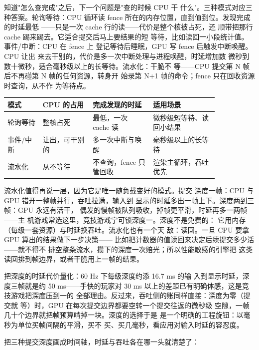 知道"怎么查完成"之后，下一个问题是"查的时候 CPU 干
什么"。三种模式对应三种答案。轮询等待：CPU 循环读
fence 所在的内存位置，直到值到位。发现完成的时延最低
——只是一次 cache 行的读——代价是整个核被占死，还
顺带把那行 cache 踢来踢去。它适合提交后马上要结果的短
等待，比如读回一小段统计值。事件/中断：CPU 在 fence 上
登记等待后睡眠，GPU 写 fence 后触发中断唤醒。CPU 让出
来去干别的，代价是多一次中断处理与进程唤醒，时延增加数
微秒到数十微秒，适合毫秒级以上的长等待。流水化：干脆不
等——CPU 提交第 N 帧后不再碰第 N 帧的任何资源，转身开
始录第 N+1 帧的命令；fence 只在回收资源时查询，从不作
为等待点。

\begin{longtable}{L{0.14\linewidth}L{0.2\linewidth}L{0.24\linewidth}L{0.26\linewidth}}
\toprule
模式 & CPU 的占用 & 完成发现的时延 & 适用场景 \\
\midrule
轮询等待 & 整核占死 & 最低，一次 cache 读 & 微秒级短等待、读回小结果 \\
事件/中断 & 让出，可干别的 & 多一次中断与唤醒 & 毫秒级以上的长等待 \\
流水化 & 从不等待 & 不查询，fence 只管回收 & 渲染主循环，吞吐优先 \\
\bottomrule
\end{longtable}

流水化值得再说一层，因为它是唯一随负载变好的模式。提交
深度一帧：CPU 与 GPU 错开一整帧并行，吞吐拉满，输入到
显示的时延多出一帧上下。深度两到三帧：GPU 永远有活干，
偶发的慢帧被队列吸收，掉帧更平滑，时延再多一两帧——主
机游戏常选这里，竞技游戏宁可锁深度一。深度不是免费的：
它用内存（每级一套资源）与时延换吞吐。流水化也有一个天
敌：读回。一旦 CPU 要拿 GPU 算出的结果做下一步决策——
比如把计数器的值读回来决定后续提交多少活——就不得不
排空整条流水，攒下的深度一次赔光；所以性能敏感的引擎把
这类读回排到帧边界，或者干脆用上一帧的结果。

把深度的时延代价量化：60 Hz 下每级深度约添 16.7 ms 的输
入到显示时延，深度三帧就是约 50 ms——手快的玩家对 30
ms 以上的差距已有明确体感，这是竞技游戏把深度压到一的
全部理由。反过来，吞吐侧的账同样直接：深度为零（提交就
等）时，GPU 在每次提交边界都要空转一个提交往返的微秒级
空隙，一帧几十个边界就把帧预算啃掉一块。深度的选择于是
是一个明确的工程旋钮：以毫秒为单位买帧间隔的平滑，买不
买、买几毫秒，看应用对输入时延的容忍度。

把三种提交深度画成时间轴，时延与吞吐各在哪一头就清楚了：

